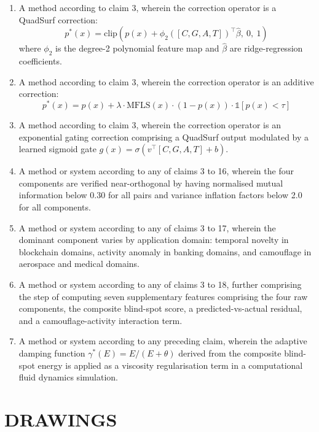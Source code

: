 \documentclass[12pt,a4paper]{article}
\begin{document}
\begin{enumerate}[label=\textbf{\arabic*.}]
\item A method according to claim 3, wherein the correction operator is a
QuadSurf correction:
\[
p^*(x) = \mathrm{clip}\!\left(p(x)+\phi_2([C,G,A,T])^\top\hat{\beta},
\ 0,\ 1\right)
\]
where $\phi_2$ is the degree-2 polynomial feature map and $\hat{\beta}$
are ridge-regression coefficients.

\item A method according to claim 3, wherein the correction operator is an
additive correction:
\[
p^*(x) = p(x) + \lambda\cdot\mathrm{MFLS}(x)\cdot(1-p(x))
\cdot\mathbb{1}[p(x)<\tau]
\]

\item A method according to claim 3, wherein the correction operator is an
exponential gating correction comprising a QuadSurf output modulated by a
learned sigmoid gate $g(x)=\sigma(v^\top[C,G,A,T]+b)$.

\item A method or system according to any of claims 3 to 16, wherein the
four components are verified near-orthogonal by having normalised mutual
information below 0.30 for all pairs and variance inflation factors below
2.0 for all components.

\item A method or system according to any of claims 3 to 17, wherein the
dominant component varies by application domain: temporal novelty in
blockchain domains, activity anomaly in banking domains, and camouflage
in aerospace and medical domains.

\item A method or system according to any of claims 3 to 18, further
comprising the step of computing seven supplementary features comprising the
four raw components, the composite blind-spot score, a predicted-vs-actual
residual, and a camouflage-activity interaction term.

\item A method or system according to any preceding claim, wherein the
adaptive damping function $\gamma^*(E)=E/(E+\theta)$ derived from the
composite blind-spot energy is applied as a viscosity regularisation term
in a computational fluid dynamics simulation.

\end{enumerate}

\section{DRAWINGS}
\end{document}
